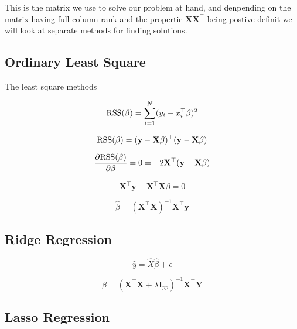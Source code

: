 \documentclass[a4paper,12pt, english]{article}
\begin{document}
This is the matrix we use to solve our problem at hand, and denpending on the matrix having full column rank and the propertie $\mathbf{X}\mathbf{X^{\top}}$ being postive definit we will look at separate methods for finding solutions.

\subsection*{Ordinary Least Square}

The least square methods 

\begin{equation}
\textnormal{RSS}(\beta) = \sum_{i=1}^{N} (y_i - x_i^{\top}\beta)^2
\end{equation}

\begin{equation}
\textnormal{RSS}(\beta) = (\mathbf{y} - \mathbf{X}\beta)^{\top}(\mathbf{y} - \mathbf{X}\beta)
\end{equation}

\begin{equation}
\frac{\partial \textnormal{RSS}(\beta)}{\partial \beta} = 0 = -2 \mathbf{X}^{\top}(\mathbf{y} - \mathbf{X}\beta)
\end{equation}

\begin{equation}
\mathbf{X}^{\top}\mathbf{y} - \mathbf{X}^{\top}\mathbf{X} \beta = 0
\end{equation}

\begin{equation}
\hat{\beta} = (\mathbf{X}^{\top}\mathbf{X})^{-1}\mathbf{X}^{\top}\mathbf{y}
\end{equation}

\subsection*{Ridge Regression}

\begin{equation}
\hat{y} = \hat{X} \hat{\beta} + \epsilon
\end{equation}

\begin{equation}
\hat{\beta} = (\mathbf{X}^{\top}\mathbf{X} + \lambda\mathbf{I}_{pp})^{-1}\mathbf{X}^{\top}\mathbf{Y}
\end{equation}

\subsection*{Lasso Regression}
\end{document}
